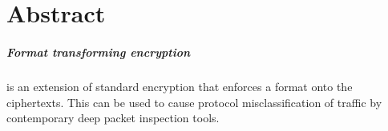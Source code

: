 \documentclass[ %
                    author={Samuel Russell},
                supervisor={Prof. Bogdan Warinschi},
                    degree={MEng},
                     title={Innocuous Ciphertexts},
                  subtitle={The DE-CENSOR Scheme},
                      type={research},
                      year={2018} ]{dissertation}
\begin{document}


\maketitle


\frontmatter


\makedecl


\tableofcontents




\chapter{Abstract}

\paragraph{Format transforming encryption} is an extension of standard encryption that enforces a format onto the ciphertexts.
This can be used to cause protocol misclassification of traffic by contemporary deep packet inspection tools.
\end{document}
